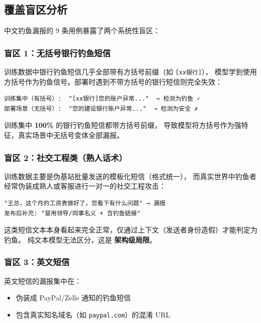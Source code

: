 \documentclass[11pt,a4paper]{article}
\begin{document}
\subsection{覆盖盲区分析}

中文钓鱼漏报的 9 条用例暴露了两个系统性盲区：

\subsubsection{盲区 1：无括号银行钓鱼短信}

训练数据中银行钓鱼短信几乎全部带有方括号前缀（如 \texttt{[xx银行]}），
模型学到使用方括号作为钓鱼信号。部署时遇到不带方括号的银行短信则完全失效：

\begin{Verbatim}[frame=single,fontsize=\small,label=带括号 vs 无括号对比]
训练集中（有括号）:  "[xx银行]您的账户异常..."  → 检测为钓鱼 ✓
部署场景（无括号）:  "您的建设银行账户异常..."  → 检测为安全 ✗
\end{Verbatim}

训练集中 \textbf{100\%} 的银行钓鱼短信都带方括号前缀，
导致模型将方括号作为强特征，真实场景中无括号变体全部漏报。

\subsubsection{盲区 2：社交工程类（熟人话术）}

训练数据主要是伪基站批量发送的模板化短信（格式统一），
而真实世界中钓鱼者经常伪装成熟人或客服进行一对一的社交工程攻击：

\begin{Verbatim}[frame=single,fontsize=\small,label=社交工程漏报示例]
"王总，这个月的工资表做好了，您看下有什么问题" → 漏报
发布后补充: "冒用领导/同事名义 + 含钓鱼链接"
\end{Verbatim}

这类短信文本本身看起来完全正常，仅通过上下文（发送者身份造假）才能判定为钓鱼。
纯文本模型无法区分，这是 \textbf{架构级局限}。

\subsubsection{盲区 3：英文短信}

英文短信的漏报集中在：
\begin{itemize}
  \item 伪装成 PayPal/Zelle 通知的钓鱼短信
  \item 包含真实知名域名（如 \texttt{paypal.com}）的混淆 URL
\end{itemize}
\end{document}
